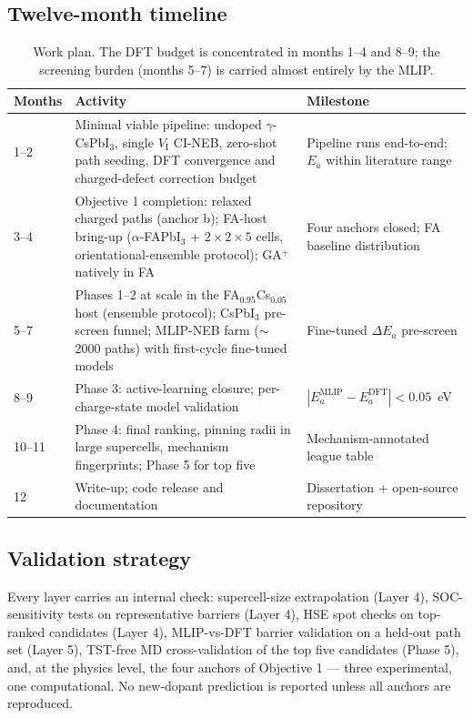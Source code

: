\documentclass[11pt,a4paper]{article}
\begin{document}
\subsection{Twelve-month timeline}
\begin{table}[H]
\centering\small
\begin{tabular}{@{}p{1.6cm}p{8.3cm}p{4.6cm}@{}}
\toprule
\textbf{Months} & \textbf{Activity} & \textbf{Milestone} \\
\midrule
1--2 & Minimal viable pipeline: undoped $\gamma$-CsPbI$_3$, single $V_{\mathrm{I}}$
CI-NEB, zero-shot path seeding, DFT convergence and charged-defect correction budget &
Pipeline runs end-to-end; $E_a$ within literature range \\
3--4 & Objective 1 completion: relaxed charged paths (anchor b); FA-host bring-up
($\alpha$-FAPbI$_3$ + $2\times2\times5$ cells, orientational-ensemble protocol);
GA$^+$ natively in FA & Four anchors closed; FA baseline distribution \\
5--7 & Phases 1--2 at scale in the FA$_{0.95}$Cs$_{0.05}$ host (ensemble protocol);
CsPbI$_3$ pre-screen funnel; MLIP-NEB farm ($\sim$2000 paths) with first-cycle
fine-tuned models & Fine-tuned $\Delta E_a$ pre-screen \\
8--9 & Phase 3: active-learning closure; per-charge-state model validation &
$|E_a^{\mathrm{MLIP}}-E_a^{\mathrm{DFT}}|<0.05$~eV \\
10--11 & Phase 4: final ranking, pinning radii in large supercells, mechanism
fingerprints; Phase 5 for top five & Mechanism-annotated league table \\
12 & Write-up; code release and documentation & Dissertation + open-source repository \\
\bottomrule
\end{tabular}
\caption{Work plan. The DFT budget is concentrated in months 1--4 and 8--9; the
screening burden (months 5--7) is carried almost entirely by the MLIP.}
\end{table}

\subsection{Validation strategy}
Every layer carries an internal check: supercell-size extrapolation (Layer 4),
SOC-sensitivity tests on representative barriers (Layer 4), HSE spot checks on
top-ranked candidates (Layer 4), MLIP-vs-DFT barrier validation on a held-out path set
(Layer 5), TST-free MD cross-validation of the top five candidates (Phase 5), and, at
the physics level, the four anchors of Objective 1 --- three experimental, one
computational. No new-dopant prediction is reported unless all anchors are reproduced.
\end{document}
